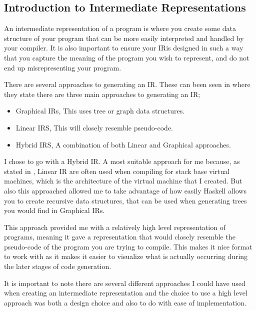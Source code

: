 \subsection{Introduction to Intermediate Representations}

An intermediate representation of a program is where you create some data structure of your program that can be more easily interpreted and handled by your compiler. It is also important to ensure your IR\footnotemark[1] is designed in such a way that you capture the meaning of the program you wish to represent, and do not end up misrepresenting your program.


There are several approaches to generating an IR. These can been seen in \cite[p.~223]{EngComp2012} where they state there are three main approaches to generating an IR; 

\begin{itemize}
\item Graphical IRs, This uses tree or graph data structures.  
\item Linear IRS, This will closely resemble pseudo-code. 
\item Hybrid IRS, A combination of both Linear and Graphical approaches.
\end{itemize}

I chose to go with a Hybrid IR. A most suitable approach for me because, as stated in \cite[p.~113]{CompDes2005}, Linear IR are often used when compiling for stack base virtual machines, which is the architecture of the virtual machine that I created. But also this approached allowed me to take advantage of how easily Haskell allows you to create recursive data structures, that can be used when generating trees you would find in Graphical IRs.  

This approach provided me with a relatively high level representation of programs, meaning it gave a representation that would closely resemble the pseudo-code of the program you are trying to compile. This makes it nice format to work with as it makes it easier to visualize what is actually occurring during the later stages of code generation. 

It is important to note there are several different approaches I could have used when creating an intermediate representation and the choice to use a high level approach was both a design choice and also to do with ease of implementation. 

